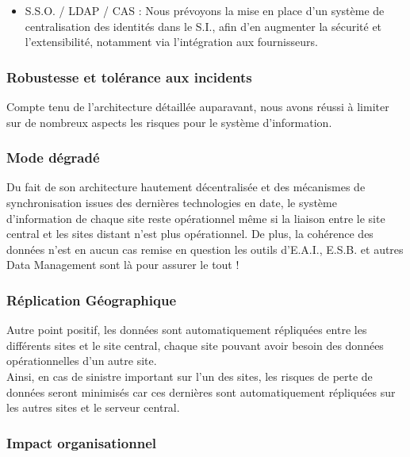 \begin{itemize}
\item S.S.O. / LDAP / CAS : Nous prévoyons la mise en place d'un système de centralisation des identités dans le S.I., afin d'en augmenter la sécurité et l'extensibilité, notamment via l'intégration aux fournisseurs.
\end{itemize}

\subsubsection{Robustesse et tolérance aux incidents}

Compte tenu de l'architecture détaillée auparavant, nous avons réussi à limiter sur de nombreux aspects les risques pour le système d'information.\\

\subsubsection* {Mode dégradé}

Du fait de son architecture hautement décentralisée et des mécanismes de synchronisation issues des dernières technologies en date, le système d'information de chaque site reste opérationnel même si la liaison entre le site central et les sites distant n'est plus opérationnel. De plus, la cohérence des données n'est en aucun cas remise en question les outils d'E.A.I., E.S.B. et autres Data Management sont là pour assurer le tout !

\subsubsection*{Réplication Géographique}
Autre point positif, les données sont automatiquement répliquées entre les différents sites et le site central, chaque site pouvant avoir besoin des données opérationnelles d'un autre site.\\
Ainsi, en cas de sinistre important sur l'un des sites, les risques de perte de données seront minimisés car ces dernières sont automatiquement répliquées sur les autres sites et le serveur central.

\subsubsection{Impact organisationnel}

